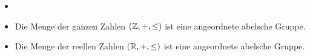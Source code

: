 %
%
%
%
%
\begin{bsp}
\begin{itemize}
\item[]
\item Die Menge der ganzen Zahlen $\left(\mathbb{Z}, +, \leq\right)$ ist eine angeordnete abelsche Gruppe.
\item Die Menge der reellen Zahlen $\left(\mathbb{R}, +, \leq\right)$ ist eine angeordnete abelsche Gruppe.
\end{itemize} 
\end{bsp}
                                                                                                                     
%

